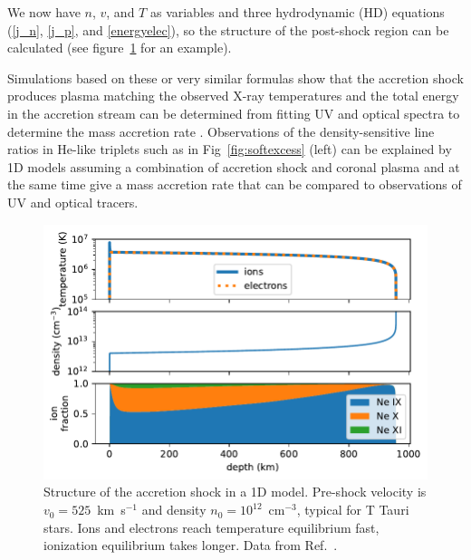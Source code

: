 \documentclass[graybox, nosecnum]{svmult}
\begin{document}
We now have $n$, $v$, and $T$ as variables and three hydrodynamic (HD) equations (\ref{j_n}, \ref{j_p}, and \ref{energyelec}), so the structure of the post-shock region can be calculated (see figure~\ref{fig:1dshock} for an example).

Simulations based on these or very similar formulas show that the accretion shock produces plasma matching the observed X-ray temperatures \citep{lamzin_1998} and the total energy in the accretion stream can be determined from fitting UV and optical spectra to determine the mass accretion rate \citep{calvet_1998}. Observations of the density-sensitive line ratios in He-like triplets such as in Fig~\ref{fig:softexcess} (left) can be explained by 1D models assuming a combination of accretion shock and coronal plasma \cite{Guenther_2007} and at the same time give a mass accretion rate that can be compared to observations of UV and optical tracers.

\begin{figure}[t]
\centering
\includegraphics[width=\textwidth]{figs/shockmodel.pdf}
\caption{Structure of the accretion shock in a 1D model. Pre-shock velocity is $v_0=525$~km~s$^{-1}$ and density $n_0=10^{12}$~cm$^{-3}$, typical for T Tauri stars. Ions and electrons reach temperature equilibrium fast, ionization equilibrium takes longer. Data from Ref.~\cite{Guenther_2007}. \label{fig:1dshock}}
\end{figure}
\end{document}
